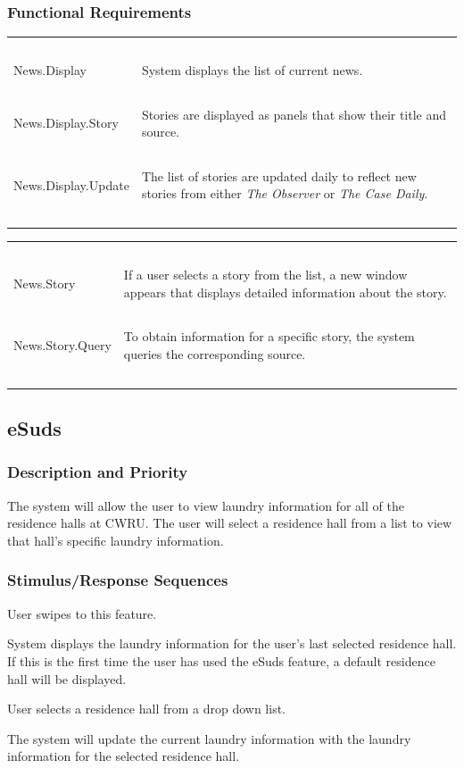 \documentclass[pdftex,12pt,letter]{article}
\begin{document}
\subsubsection{Functional Requirements}
\begin{table}[!h]
\begin{tabularx}{\textwidth}[t]{|l Y|}
\hline
~&~\\
News.Display & System displays the list of current news.\\
~&~\\
News.Display.Story & Stories are displayed as panels that show their title and source.\\
~&~\\
News.Display.Update & The list of stories are updated daily to reflect new stories from either \emph{The Observer} or \emph{The Case Daily}.\\
~&~\\
\hline
\end{tabularx}
\end{table}
\begin{table}[!h]
\begin{tabularx}{\textwidth}[t]{|l Y|}
\hline
~&~\\
News.Story & If a user selects a story from the list, a new window appears that displays detailed information about the story.\\
~&~\\
News.Story.Query & To obtain information for a specific story, the system queries the corresponding source.\\
~&~\\
\hline
\end{tabularx}
\end{table}
\FloatBarrier
\subsection{eSuds}
\subsubsection{Description and Priority}
The system will allow the user to view laundry information for all of the residence halls at CWRU. The user will select a residence hall from a list to view that hall's specific laundry information.
\subsubsection{Stimulus/Response Sequences}
\begin{description}\itemsep1pt
\item[Stimulus:] User swipes to this feature.
\item[Response:] System displays the laundry information for the user's last selected residence hall. If this is the first time the user has used the eSuds feature, a default residence hall will be displayed.
\item[Stimulus:] User selects a residence hall from a drop down list.
\item[Response:] The system will update the current laundry information with the laundry information for the selected residence hall.
\end{description}
\end{document}
